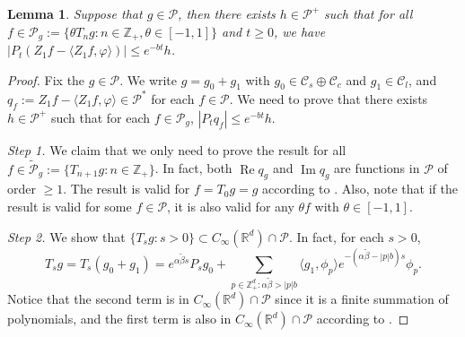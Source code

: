 \documentclass[12pt,a4paper]{amsart}
\theoremstyle{plain}
\newtheorem{lem}[thm]{Lemma}
\theoremstyle{definition}
\numberwithin{equation}{section}
\begin{document}
\begin{lem}
  \label{lem:P:R}
  Suppose that $g \in \mathcal P$, then there exists $h \in \mathcal P^+$ such that for all $ f \in \mathcal P_g := \{\theta T_n g: n \in \mathbb Z_+, \theta \in [-1,1]\} $ and $t\geq 0$, we have $ | P_t (Z_1 f - \langle Z_1 f, \varphi \rangle )| \leq e^{-bt} h$.
\end{lem}
\begin{proof}
Fix the $g \in \mathcal P$.
We write  $g = g_0 + g_1$ with $g_0 \in \mathcal C_s \oplus \mathcal C_c$ and $g_1 \in \mathcal C_l$,  and $q_f:=Z_1f - \langle Z_1f, \varphi \rangle\in \mathcal P^*$ for each $f\in \mathcal P$.
  We need to prove that there exists $h \in \mathcal P^+$ such that for each $f\in \mathcal P_g$, $|P_tq_f| \leq e^{-bt} h$.

  \emph{Step 1.} We claim  that we only need to prove the result for all
  $f \in \widetilde{\mathcal P}_g:= \{T_{n+1} g : n \in \mathbb Z_+\}$.
  In fact, both $\operatorname{Re} q_g$ and $\operatorname{Im} q_g$ are functions in $\mathcal P$ of order $\geq 1$.
  The result is valid for $f = T_0 g = g$ according to \cite[Fact 1.2]{MarksMilos2018CLT}.
  Also, note that if the result is valid for some $f \in \mathcal P$, it is also valid for any $\theta f$ with $\theta \in [-1,1]$.


  \emph{Step 2.} We show that $\{T_s g: s> 0\} \subset C_\infty (\mathbb R^d) \cap \mathcal P$.
  In fact, for each $s > 0$,
  \[
    T_s g
    = T_s (g_0 + g_1)
    = e^{\alpha \tilde \beta s}P_s g_0 + \sum_{p \in \mathbb Z_+^d: \alpha \tilde \beta > |p|b} \langle g_1, \phi_p \rangle e^{-(\alpha \tilde \beta - |p|b)s} \phi_p.
  \]
  Notice that the second term is in $C_\infty(\mathbb R^d)\cap \mathcal P$ since it is a finite summation of polynomials, and the first term is also in $C_\infty (\mathbb R^d) \cap \mathcal P$ according to \cite[Fact 1.1]{MarksMilos2018CLT}.


\end{proof}
\end{document}
